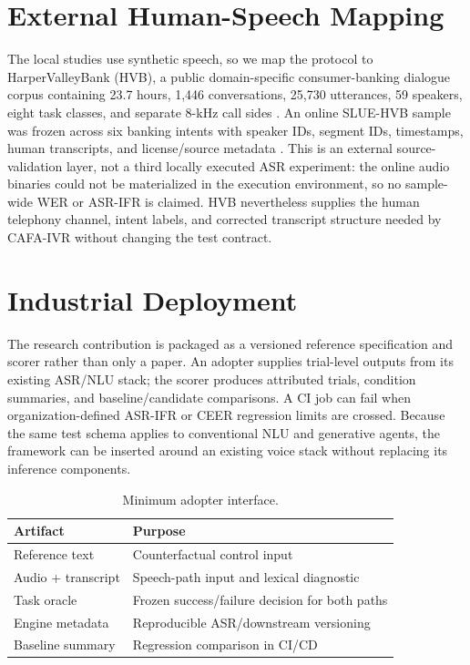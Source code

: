\documentclass[conference]{IEEEtran}
\begin{document}
\section{External Human-Speech Mapping}
The local studies use synthetic speech, so we map the protocol to HarperValleyBank (HVB), a public domain-specific consumer-banking dialogue corpus containing 23.7 hours, 1,446 conversations, 25,730 utterances, 59 speakers, eight task classes, and separate 8-kHz call sides \cite{wu2020hvb}. An online SLUE-HVB sample was frozen across six banking intents with speaker IDs, segment IDs, timestamps, human transcripts, and license/source metadata \cite{shon2022slue2}. This is an external source-validation layer, not a third locally executed ASR experiment: the online audio binaries could not be materialized in the execution environment, so no sample-wide WER or ASR-IFR is claimed. HVB nevertheless supplies the human telephony channel, intent labels, and corrected transcript structure needed by CAFA-IVR without changing the test contract.

\section{Industrial Deployment}
The research contribution is packaged as a versioned reference specification and scorer rather than only a paper. An adopter supplies trial-level outputs from its existing ASR/NLU stack; the scorer produces attributed trials, condition summaries, and baseline/candidate comparisons. A CI job can fail when organization-defined ASR-IFR or CEER regression limits are crossed. Because the same test schema applies to conventional NLU and generative agents, the framework can be inserted around an existing voice stack without replacing its inference components.

\begin{table}[t]
\caption{Minimum adopter interface.}
\label{tab:adopt}
\centering\scriptsize
\begin{tabular}{p{}p{}}
\toprule
Artifact & Purpose\\
\midrule
Reference text & Counterfactual control input\\
Audio + transcript & Speech-path input and lexical diagnostic\\
Task oracle & Frozen success/failure decision for both paths\\
Engine metadata & Reproducible ASR/downstream versioning\\
Baseline summary & Regression comparison in CI/CD\\
\bottomrule
\end{tabular}
\end{table}
\end{document}
